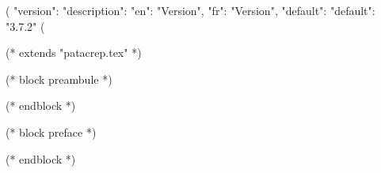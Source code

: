 %
%
%

(%
{
"version":{ "description": {"en": "Version", "fr": "Version"},
            "default": {"default": "3.7.2"}
         }
}
(%

(* extends "patacrep.tex" *)

(* block preambule *)
\usepackage{licence}
(* endblock *)

(* block preface *)
\newpage

\newpage
(* endblock *)
